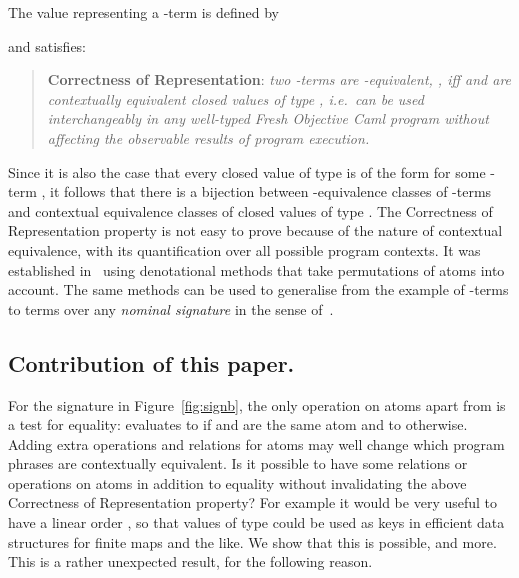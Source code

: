 \documentclass{LMCS}
\theoremstyle{plain}
\theoremstyle{definition}
\begin{document}
The value  representing a -term  is
defined by

and satisfies:
\begin{quote}
  \textbf{Correctness of Representation}: \emph{two -terms
    are -equivalent, , iff  and
     are contextually equivalent closed values of type
    , i.e.~can be used interchangeably in any well-typed Fresh
    Objective Caml program without affecting the observable results of
    program execution.}
\end{quote}
Since it is also the case that every closed value of type  is
of the form  for some -term , it follows that
there is a bijection between -equivalence classes of
-terms and contextual equivalence classes of closed values of
type .  The Correctness of Representation property is not easy
to prove because of the nature of contextual equivalence, with its
quantification over all possible program contexts. It was established
in~\cite{ShinwellMR:freafp,PittsAM:monsf} using denotational methods
that take permutations of atoms into account. The same methods can be
used to generalise from the example of -terms to terms over
any \emph{nominal signature} in the sense of~\cite{PittsAM:nomu-jv}.

\subsection*{Contribution of this paper.}

For the signature in Figure~\ref{fig:signb}, the only operation on
atoms apart from  is a test for equality: 
evaluates to  if  and  are the same atom and to
 otherwise. Adding extra operations and relations for atoms
may well change which program phrases are contextually equivalent.  Is
it possible to have some relations or operations on atoms in addition
to equality without invalidating the above Correctness of
Representation property? For example it would be very useful to have a
linear order , so that
values of type  could be used as keys in efficient data
structures for finite maps and the like. We show that this  is
possible, and more.  This is a rather unexpected result, for the
following reason.
\end{document}
